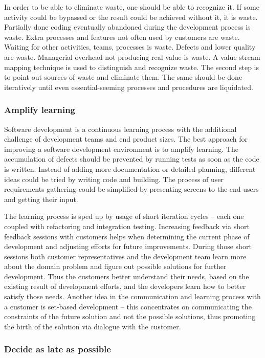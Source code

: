 In order to be able to eliminate waste, one should be able to recognize it. If some activity could be bypassed or the result could be achieved without it, it is waste. Partially done coding eventually abandoned during the development process is waste. Extra processes and features not often used by customers are waste. Waiting for other activities, teams, processes is waste. Defects and lower quality are waste. Managerial overhead not producing real value is waste. A value stream mapping technique is used to distinguish and recognize waste. The second step is to point out sources of waste and eliminate them. The same should be done iteratively until even essential-seeming processes and procedures are liquidated.

\subsubsection{Amplify learning}

Software development is a continuous learning process with the additional challenge of development teams and end product sizes. The best approach for improving a software development environment is to amplify learning. The accumulation of defects should be prevented by running tests as soon as the code is written. Instead of adding more documentation or detailed planning, different ideas could be tried by writing code and building. The process of user requirements gathering could be simplified by presenting screens to the end-users and getting their input.

The learning process is sped up by usage of short iteration cycles – each one coupled with refactoring and integration testing. Increasing feedback via short feedback sessions with customers helps when determining the current phase of development and adjusting efforts for future improvements. During those short sessions both customer representatives and the development team learn more about the domain problem and figure out possible solutions for further development. Thus the customers better understand their needs, based on the existing result of development efforts, and the developers learn how to better satisfy those needs. Another idea in the communication and learning process with a customer is set-based development – this concentrates on communicating the constraints of the future solution and not the possible solutions, thus promoting the birth of the solution via dialogue with the customer.

\subsubsection{Decide as late as possible}

